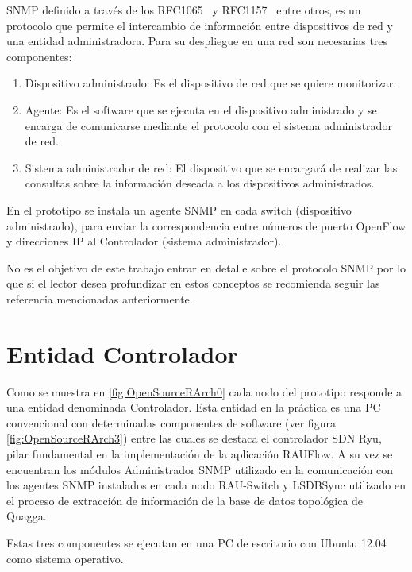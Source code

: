 SNMP definido a través de los RFC1065~\citep{rose1990structure} y RFC1157~\citep{case1989simple} entre otros, es un protocolo que permite el intercambio de información entre dispositivos de red y una entidad administradora. Para su despliegue en una red son necesarias tres componentes: 

\begin{enumerate}

\item Dispositivo administrado: Es el dispositivo de red que se quiere monitorizar.

\item Agente: Es el software que se ejecuta en el dispositivo administrado y se encarga de comunicarse mediante el protocolo con el sistema administrador de red.

\item Sistema administrador de red: El dispositivo que se encargar\'a de realizar las consultas sobre la información deseada a los dispositivos administrados.

\end{enumerate}	

En el prototipo se instala un agente SNMP en cada switch (dispositivo administrado), para enviar la correspondencia entre números de puerto OpenFlow y direcciones IP al Controlador (sistema administrador).

No es el objetivo de este trabajo entrar en detalle sobre el protocolo SNMP por lo que si el lector desea profundizar en estos conceptos se recomienda seguir las referencia mencionadas anteriormente.

\section{Entidad Controlador}
Como se muestra en \ref{fig:OpenSourceRArch0} cada nodo del prototipo responde a una entidad denominada Controlador. Esta entidad en la pr\'actica es una PC convencional con determinadas componentes de software (ver figura \ref{fig:OpenSourceRArch3}) entre las cuales se destaca el controlador SDN Ryu, pilar fundamental en la implementaci\'on de la aplicaci\'on RAUFlow. A su vez se encuentran los módulos Administrador SNMP utilizado en la comunicaci\'on con los agentes SNMP instalados en cada nodo RAU-Switch y LSDBSync utilizado en el proceso de extracci\'on de informaci\'on de la base de datos topol\'ogica de Quagga. 

Estas tres componentes se ejecutan en una PC de escritorio con Ubuntu 12.04 como sistema operativo. 

